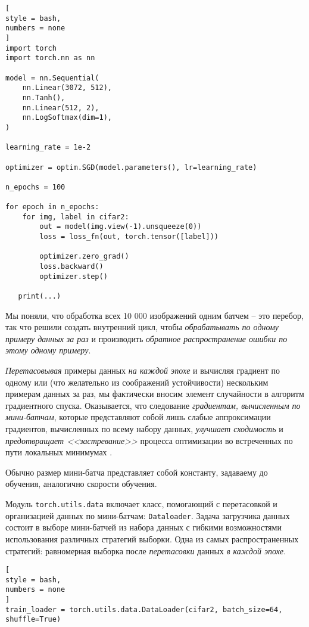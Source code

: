 \documentclass[%
	11pt,
	a4paper,
	utf8,
		]{article}
\begin{document}
\begin{lstlisting}[
style = bash,
numbers = none
]
import torch
import torch.nn as nn

model = nn.Sequential(
    nn.Linear(3072, 512),
    nn.Tanh(),
    nn.Linear(512, 2),
    nn.LogSoftmax(dim=1),
)

learning_rate = 1e-2

optimizer = optim.SGD(model.parameters(), lr=learning_rate)

n_epochs = 100

for epoch in n_epochs:
    for img, label in cifar2:
        out = model(img.view(-1).unsqueeze(0))
        loss = loss_fn(out, torch.tensor([label]))
        
        optimizer.zero_grad()
        loss.backward()
        optimizer.step()
   
   print(...)
\end{lstlisting}

Мы поняли, что обработка всех 10 000 изображений одним батчем -- это перебор, так что решили создать внутренний цикл, чтобы \emph{обрабатывать по одному примеру данных за раз} и производить \emph{обратное распространение ошибки по этому одному примеру}.

\emph{Перетасовывая} примеры данных \emph{на каждой эпохе} и вычисляя градиент по одному или (что желательно из соображений устойчивости) нескольким примерам данных за раз, мы фактически вносим элемент случайности в алгоритм градиентного спуска. Оказывается, что следование \emph{градиентам, вычисленным по мини-батчам}, которые представляют собой лишь слабые аппроксимации градиентов, вычисленных по всему набору данных, \emph{улучшает сходимость} и \emph{предотвращает <<застревание>>} процесса оптимизации во встреченных по пути локальных минимумах \cite[]{pytorch-2022}.

Обычно размер мини-батча представляет собой константу, задаваему до обучения, аналогично скорости обучения. 

Модуль \verb|torch.utils.data| включает класс, помогающий с перетасовкой и организацией данных по мини-батчам: \verb|Dataloader|. Задача загрузчика данных состоит в выборе мини-батчей из набора данных с гибкими возможностями использования различных стратегий выборки. Одна из самых распространенных стратегий: равномерная выборка после \emph{перетасовки} данных \emph{в каждой эпохе}.

\begin{lstlisting}[
style = bash,
numbers = none
]
train_loader = torch.utils.data.DataLoader(cifar2, batch_size=64, shuffle=True)
\end{lstlisting}
\end{document}
